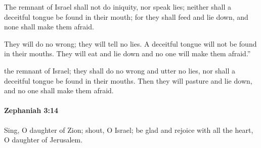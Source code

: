 			\begin{versebox}
					\item[BHS] 
					\item[LXX] 
					\item[ASV] The remnant of Israel shall not do iniquity, nor speak lies; neither shall a deceitful tongue be found in their mouth; for they shall feed and lie down, and none shall make them afraid.
					\item[NIV] They will do no wrong; they will tell no lies. A deceitful tongue will not be found in their mouths. They will eat and lie down and no one will make them afraid.”
					\item[NRSV] the remnant of Israel; they shall do no wrong and utter no lies, nor shall a deceitful tongue be found in their mouths. Then they will pasture and lie down, and no one shall make them afraid.
			\end{versebox}

		\paragraph{Zephaniah 3:14} %
			\label{ZEPHANIAH-3-14}

			Sing, O daughter of Zion; shout, O Israel; be glad and rejoice with all the heart, O daughter of Jerusalem.

